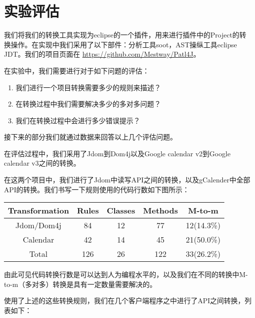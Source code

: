 
\chapter{实验评估}

我们将我们的转换工具实现为eclipse的一个插件，用来进行插件中的Project的转换操作。在实现中我们采用了以下部件：分析工具soot，AST操纵工具eclipse JDT。我们的项目页面在 \url{https://github.com/Mestway/Patl4J}。

在实验中，我们需要进行对于如下问题的评估：
\begin{enumerate}
\item 我们进行一个项目转换需要多少的规则来描述？
\item 在转换过程中我们需要解决多少的多对多问题？
\item 我们在转换过程中会进行多少错误提示？
\end{enumerate}
接下来的部分我们就通过数据来回答以上几个评估问题。

在评估过程中，我们采用了Jdom到Dom4j以及Google calendar v2到Google calendar v3之间的转换。

在这两个项目中，我们进行了Jdom中读写API之间的转换，以及gCalender中全部API的转换。我们书写一下规则使用的代码行数如下图所示：

\begin{center}
    \begin{tabular}{|c|c|c|c|c|}
        \hline
        Transformation & Rules & Classes & Methods & M-to-m\\
        \hline \hline
        Jdom/Dom4j & 84 & 12 & 77  & 12(14.3\%) \\
        \hline
        Calendar & 42 & 14 & 45 & 21(50.0\%) \\
      \hline
      \hline
      Total & 126 & 26 & 122 & 33(26.2\%) \\ 
        \hline
    \end{tabular}
\end{center}


由此可见代码转换行数是可以达到人为编程水平的，以及我们在不同的转换中M-to-m（多对多）转换是具有一定数量需要解决的。

使用了上述的这些转换规则，我们在几个客户端程序之中进行了API之间转换，列表如下：

